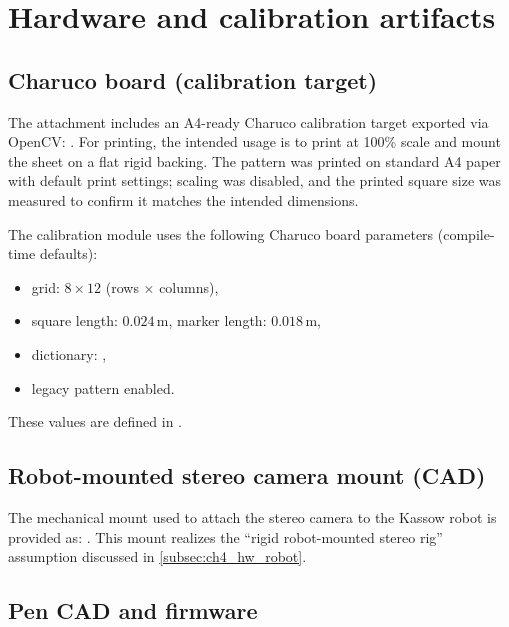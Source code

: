 \section{Hardware and calibration artifacts}
\label{appendix:artifacts}

\subsection{Charuco board (calibration target)}
\label{appendix:charuco}

The attachment includes an A4-ready Charuco calibration target exported via OpenCV:
.
For printing, the intended usage is to print at 100\% scale and mount the sheet on a flat rigid backing.
The pattern was printed on standard A4 paper with default print settings; scaling was disabled, and the printed square size was measured to confirm it matches the intended dimensions.

The calibration module uses the following Charuco board parameters (compile-time defaults):
\begin{itemize}
    \item grid: $8 \times 12$ (rows $\times$ columns),
    \item square length: $0.024\,\mathrm{m}$, marker length: $0.018\,\mathrm{m}$,
    \item dictionary: ,
    \item legacy pattern enabled.
\end{itemize}

These values are defined in .

\subsection{Robot-mounted stereo camera mount (CAD)}
\label{appendix:camera_mount_cad}

The mechanical mount used to attach the stereo camera to the Kassow robot is provided as:
.
This mount realizes the ``rigid robot-mounted stereo rig'' assumption discussed in \autoref{subsec:ch4_hw_robot}.

\subsection{Pen CAD and firmware}
\label{appendix:pen_artifacts}


